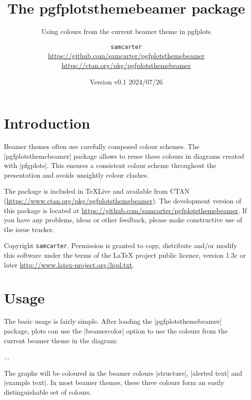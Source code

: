 \documentclass{scrartcl}
\title{The pgfplotsthemebeamer package}
\subtitle{Using colours from the current beamer theme in pgfplots}
\author{%
  \texorpdfstring{
    \texttt{samcarter}\\
    \url{https://github.com/samcarter/pgfplotsthemebeamer}\\
    \url{https://ctan.org/pkg/pgfplotsthemebeamer}
  }{samcarter}}
\date{Version v0.1 \textendash{} 2024/07/26}
\begin{document}
\maketitle

\section{Introduction}
\label{intro}

Beamer themes often use carefully composed colour schemes. The \saminline|pgfplotsthemebeamer| package allows to reuse these colours in diagrams created with \saminline|pfgplots|. This ensures a consistent colour scheme throughout the presentation and avoids unsightly colour clashes.

The package is included in \TeX{}Live 
and available from \textsc{CTAN} (\url{https://www.ctan.org/pkg/pgfplotsthemebeamer}).
The development version of this package is located at \url{https://github.com/samcarter/pgfplotsthemebeamer}. If you have any problems, ideas or other feedback, please make constructive use of the issue tracker.

Copyright  \texttt{samcarter}. Permission is granted to copy, distribute and\slash or modify this software under the terms of the LaTeX project public licence, version 1.3c or later \url{http://www.latex-project.org/lppl.txt}.

\section{Usage}

The basic usage is fairly simple. After loading the \saminline|pgfplotsthemebeamer| package, plots can use the \saminline|beamercolor| option to use the colours from the current beamer theme in the diagram:
\begin{tcolorbox}[title={Usage}]
\begin{samcode}
\usepackage{pgfplotsthemebeamer}

\begin{axis}[
  beamercolors
]
...
\end{axis}
\end{samcode}
\end{tcolorbox}
The graphs will be coloured in the beamer colours \saminline|structure|, \saminline|alerted text| and \saminline|example text|. In most beamer themes, these three colours form an easily distinguishable set of colours.
\end{document}
